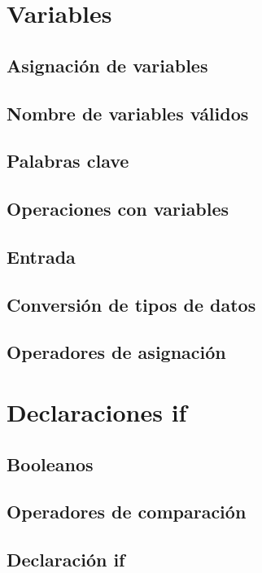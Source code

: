 \documentclass{report}
\begin{document}
\clearpage\chapter{Variables}

\section{Asignación de variables}

\section{Nombre de variables válidos}

\section{Palabras clave}

\section{Operaciones con variables}

\section{Entrada}

\section{Conversión de tipos de datos}

\section{Operadores de asignación}

\clearpage\chapter{Declaraciones if}

\section{Booleanos}

\section{Operadores de comparación}

\section{Declaración if}
\end{document}
